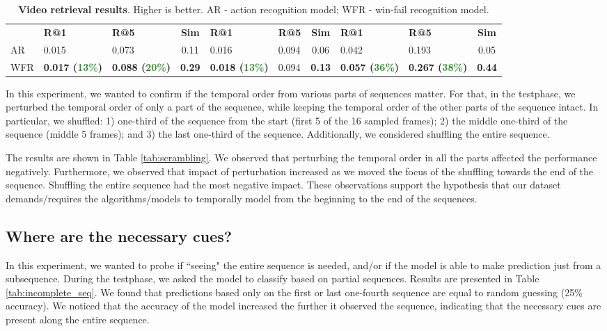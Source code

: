 \documentclass[final]{cvpr}
\begin{document}
\begin{table*}[]
\begin{tabular}{lllcllcllc}
                                & \textbf{R@1}         & \textbf{R@5}          & \textbf{Sim } & \textbf{R@1}          & \textbf{R@5} & \textbf{Sim } & \textbf{R@1}          & \textbf{R@5}          & \textbf{Sim } \\ \cmidrule(r){1-1} \cmidrule(l){2-2} \cmidrule(l){3-3} \cmidrule(l){4-4} \cmidrule(l){5-5} \cmidrule(l){6-6} \cmidrule(l){7-7} \cmidrule(l){8-8} \cmidrule(l){9-9} \cmidrule(l){10-10}
AR              & 0.015                 & 0.073                 & 0.11           & 0.016                 & 0.094        & 0.06           & 0.042                 & 0.193                 & 0.05           \\
WFR            & \textbf{0.017 (\textcolor{ForestGreen}{13\%})} & \textbf{0.088 (\textcolor{ForestGreen}{20\%})} & \textbf{0.29}  & \textbf{0.018 (\textcolor{ForestGreen}{13\%})} & 0.094  & \textbf{0.13}  & \textbf{0.057 (\textcolor{ForestGreen}{36\%})} & \textbf{0.267 (\textcolor{ForestGreen}{38\%})} & \textbf{0.44}  \\ \bottomrule
\end{tabular}
\caption{\textbf{Video retrieval results}. Higher is better. AR - action recognition model; WFR - win-fail recognition model.}
\label{tab:res_video_retrieval}
\end{table*} In this experiment, we wanted to confirm if the temporal order from various parts of sequences matter. For that, in the testphase, we perturbed the temporal order of only a part of the sequence, while keeping the temporal order of the other parts of the sequence intact. In particular, we shuffled: 1) one-third of the sequence from the start (first 5 of the 16 sampled frames); 2) the middle one-third of the sequence (middle 5 frames); and 3) the last one-third of the sequence. Additionally, we considered shuffling the entire sequence.

The results are shown in Table \ref{tab:scrambling}. We observed that perturbing the temporal order in all the parts affected the performance negatively. Furthermore, we observed that impact of perturbation increased as we moved the focus of the shuffling towards the end of the sequence. Shuffling the entire sequence had the most negative impact. These observations support the hypothesis that our dataset demands/requires the algorithms/models to temporally model from the beginning to the end of the sequences.
\subsection{Where are the necessary cues?}
\label{sec:exp_incomplete_seq}
In this experiment, we wanted to probe if ``seeing" the entire sequence is needed, and/or if the model is able to make prediction just from a subsequence. During the testphase, we asked the model to classify based on partial sequences. Results are presented in Table \ref{tab:incomplete_seq}. We found that predictions based only on the first or last one-fourth sequence are equal to random guessing (25\% accuracy). We noticed that the accuracy of the model increased the further it observed the sequence, indicating that the necessary cues are present along the entire sequence.
\end{document}
